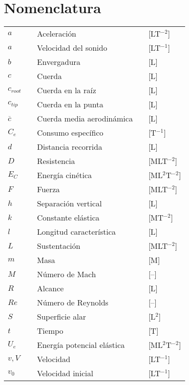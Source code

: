 \section*{Nomenclatura}
\label{sec:nomenclatura}

\begin{longtable*}{p{20mm} c p{80mm} c p{40mm} }
$a$ 			&& Aceleración                  && [LT$^{-2}$]\\
$a$ 			&& Velocidad del sonido         && [LT$^{-1}$]\\
$b$ 			&& Envergadura                  && [L]\\
$c$	            && Cuerda                       && [L]\\
$c_{root}$	    && Cuerda en la raíz            && [L]\\
$c_{tip}$	    && Cuerda en la punta           && [L]\\
$\overline{c}$	&& Cuerda media aerodinámica    && [L]\\
$C_e$ 			&& Consumo específico           && [T$^{-1}$]\\
$d$ 			&& Distancia recorrida          && [L]\\
$D$ 			&& Resistencia                  && [MLT$^{-2}$]\\
$E_C$ 			&& Energía cinética             && [ML$^2$T$^{-2}$]\\
$F$ 			&& Fuerza                       && [MLT$^{-2}$]\\
$h$ 			&& Separación vertical          && [L]\\
$k$ 			&& Constante elástica           && [MT$^{-2}$]\\
$l$ 			&& Longitud característica      && [L]\\
$L$ 			&& Sustentación                 && [MLT$^{-2}$]\\
$m$ 			&& Masa                         && [M]\\
$M$ 			&& Número de Mach               && [–]\\
$R$ 			&& Alcance                      && [L]\\
$Re$ 			&& Número de Reynolds           && [–]\\
$S$ 			&& Superficie alar              && [L$^2$]\\
$t$ 			&& Tiempo                       && [T]\\
$U_e$ 			&& Energía potencial elástica   && [ML$^2$T$^{-2}$]\\
$v, V$ 			&& Velocidad                    && [LT$^{-1}$]\\
$v_0$ 			&& Velocidad inicial            && [LT$^{-1}$]\\

\end{longtable*}
